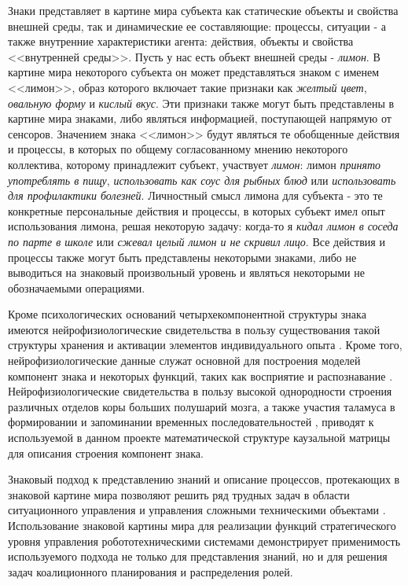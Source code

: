 \documentclass[12pt]{report}
\begin{document}
	Знаки представляет в картине мира субъекта как статические объекты и свойства внешней среды, так и динамические ее составляющие: процессы, ситуации - а также внутренние характеристики агента: действия, объекты и свойства <<внутренней среды>>. Пусть у нас есть объект внешней среды - \textit{лимон}. В картине мира некоторого субъекта он может представляться знаком с именем <<лимон>>, образ которого включает такие признаки как \textit{желтый цвет}, \textit{овальную форму} и \textit{кислый вкус}. Эти признаки также могут быть представлены в картине мира знаками, либо являться информацией, поступающей напрямую от сенсоров. Значением знака <<лимон>> будут являться те обобщенные действия и процессы, в которых по общему согласованному мнению некоторого коллектива, которому принадлежит субъект, участвует \textit{лимон}: лимон \textit{принято употреблять в пищу}, \textit{использовать как соус для рыбных блюд} или \textit{использовать для профилактики болезней}. Личностный смысл лимона для субъекта - это те конкретные персональные действия и процессы, в которых субъект имел опыт использования лимона, решая некоторую задачу: когда-то я \textit{кидал лимон в соседа по парте в школе} или \textit{сжевал целый лимон и не скривил лицо}. Все действия и процессы также могут быть представлены некоторыми знаками, либо не выводиться на знаковый произвольный уровень и являться некоторыми не обозначаемыми операциями.
	
	Кроме психологических оснований четырхекомпонентной структуры знака имеются нейрофизиологические свидетельства в пользу существования такой структуры хранения и активации элементов индивидуального опыта \cite{Edelman1987,Ivanitsky1996}. Кроме того, нейрофизиологические данные служат основной для построения моделей компонент знака и некоторых функций, таких как восприятие и распознавание \cite{George2009,Panov2014d}. Нейрофизиологические свидетельства в пользу высокой однородности строения различных отделов коры больших полушарий мозга, а также участия таламуса в формировании и запоминании временных последовательностей \cite{Buxhoeveden2002,Constantinople2013}, приводят к используемой в данном проекте  математической структуре каузальной матрицы \cite{Panov2015c} для описания строения компонент знака.
	
	Знаковый подход к представлению знаний и описание процессов, протекающих в знаковой картине мира позволяют решить ряд трудных задач в области ситуационного управления \cite{Osipov1999,Osipov2002c} и управления сложными техническими объектами \cite{Zubarev2013}. Использование знаковой картины мира для реализации функций стратегического уровня управления робототехническими системами \cite{Makarov2015a} демонстрирует применимость используемого подхода не только для представления знаний, но и для решения задач коалиционного планирования и распределения ролей.
	
\end{document}
